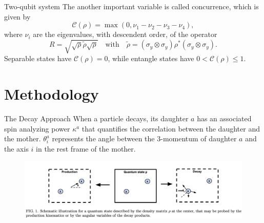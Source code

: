 \documentclass{beamer}
\begin{document}
    \begin{frame}{Two-qubit system}
        The another important variable is called concurrence, which is given by 
        \begin{equation*}
            \mathcal{C}(\rho) = \max(0, \nu_1-\nu_2-\nu_3-\nu_4),
        \end{equation*}
        where $\nu_i$ are the eigenvalues, with descendent order, of the operator
        \begin{equation*}
            R=\sqrt{\sqrt{\rho}\tilde{\rho}\sqrt{\rho}} \quad \text{with} \quad \tilde{\rho} = (\sigma_y\otimes \sigma_y)\rho^*(\sigma_y\otimes \sigma_y).
        \end{equation*}
        Separable states have $\mathcal{C}(\rho) = 0$, while entangle states have $0<\mathcal{C}(\rho) \leq 1$.
        \begin{center}
            \footnotesize {}
        \end{center}
    \end{frame}
    
    \section{Methodology}

    \begin{frame}{The Decay Approach}
        When a particle decays, its daughter $a$ has an associated spin analyzing power $\kappa^a$ that quantifies the correlation between the daughter and the mother. 
        $\theta^a_i$ represents the angle between the 3-momentum of daughter $a$ and the axis $i$ in the rest frame of the mother.
        \begin{figure}[htbp]
            \centering
            \includegraphics[width=\linewidth]{img/DecayApproach.png}
        \end{figure}
        \begin{center}
            \footnotesize {}
        \end{center}
    \end{frame}
\end{document}
